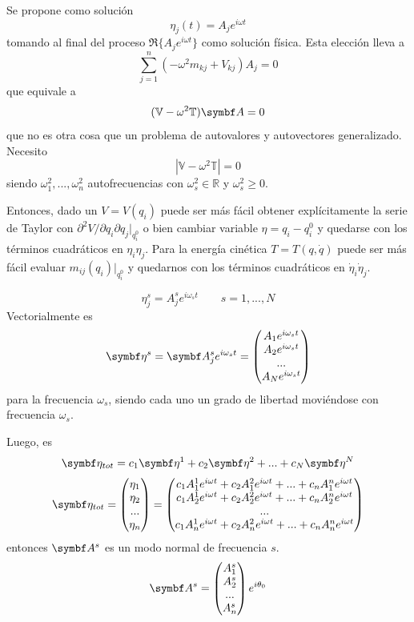 \documentclass[10pt,oneside]{CBFT_book}
\begin{document}
Se propone como solución 
\[
	\eta_j(t)  = A_j e^{i\omega t}
\]
tomando al final del proceso $\Re\{A_j e^{i\omega t}\}$ como solución física. Esta elección lleva a
\[
	\sum_{j=1}^n ( - \omega^2 m_{kj} + V_{kj} ) A_j = 0
\]
que equivale a
\[
	(\mathbb{V} -\omega^2\mathbb{T})\vb{A} = 0
\]
que no es otra cosa que un problema de autovalores y autovectores generalizado. Necesito
\[
	\left| \mathbb{V} -\omega^2\mathbb{T} \right| = 0
\]
siendo $\omega^2_1, ...,\omega^2_n$ autofrecuencias con $\omega^2_s \in \mathbb{R}$ y $\omega^2_s \geq 0$.

Entonces, dado un $V=V(q_i)$ puede ser más fácil obtener explícitamente la serie de Taylor con 
$\partial^2 V/ \partial q_i \partial q_j |_{q_i^0}$ o bien cambiar variable $\eta = q_i - q_i^0$ y quedarse
con los términos cuadráticos en $\eta_i \eta_j$. Para la energía cinética $T=T(q,\dot{q})$ puede ser más
fácil evaluar $m_{ij}(q_i)|_{q_i^0}$ y quedarnos con los términos cuadráticos en $\dot{\eta}_i \dot{\eta}_j$.

\[
	\eta_j^s = A_j^s e^{i\omega_s t}	 \qquad s=1,...,N
\]
Vectorialmente es 
\[
	\vb{\eta}^s = \vb{A}_j^s e^{i\omega_s t} = \begin{pmatrix}
	                A_1 e^{i\omega_s t} \\
	                A_2 e^{i\omega_s t} \\
	                ... \\
	                A_N e^{i\omega_s t} \\
	               \end{pmatrix}
\]
para la frecuencia $\omega_s$, siendo cada uno un grado de libertad moviéndose con frecuencia $\omega_s$.

Luego, es
\[
	\vb{\eta}_{tot} = c_1 \vb{\eta}^1 + c_2 \vb{\eta}^2 + ... + c_N \vb{\eta}^N
\]
\[
	\vb{\eta}_{tot} = \begin{pmatrix}
				\eta_1 \\
				\eta_2 \\
				... \\
				\eta_n 
	                  \end{pmatrix}
	                 = \begin{pmatrix}
				c_1 A_1^1 e^{i\omega t} + c_2 A_1^2 e^{i\omega t} + ... + c_n A_1^n e^{i\omega t} \\
				c_1 A_2^1 e^{i\omega t} + c_2 A_2^2 e^{i\omega t} + ... + c_n A_2^n e^{i\omega t} \\
				... \\
				c_1 A_n^1 e^{i\omega t} + c_2 A_n^2 e^{i\omega t} + ... + c_n A_n^n e^{i\omega t}
	                  \end{pmatrix}
\]
entonces $\vb{A}^s$ es un modo normal de frecuencia $s$.
\[
	\vb{A}^s = \begin{pmatrix}
	            A_1^s \\
	            A_2^s \\
	            ... \\
	            A_n^s
	           \end{pmatrix}
	           e^{i\theta_0}
\]
\end{document}
